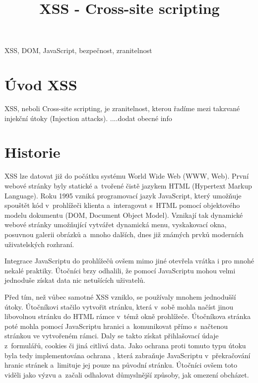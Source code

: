 \documentclass[conference]{IEEEtran}
\begin{document}
\title{XSS \-- Cross\--site scripting}

\author{
}
\maketitle

\begin{abstract}

\end{abstract}

\begin{IEEEkeywords}
XSS, DOM, JavaScript, bezpečnost, zranitelnost
\end{IEEEkeywords}

\section{Úvod XSS}
XSS, neboli Cross-site scripting, je zranitelnost, kterou řadíme mezi takzvané injekční útoky (Injection attacks). ....dodat obecné info

\section{Historie}
XSS lze datovat již do počátku systému World Wide Web (WWW, Web). První webové stránky byly statické a~tvořené čistě jazykem HTML (Hypertext Markup Language). Roku 1995 vzniká programovací jazyk JavaScript, který umožňuje spouštět kód v~prohlížeči klienta a~interagovat s~HTML pomocí objektového modelu dokumentu (DOM,  Document Object Model). Vznikají tak dynamické webové stránky umožňující vytvářet dynamická menu, vyskakovací okna, posuvnou galerii obrázků a~mnoho dalších, dnes již známých prvků moderních uživatelských rozhraní. 

Integrace JavaScriptu do prohlížečů ovšem mimo jiné otevřela vrátka i pro mnohé nekalé praktiky. Útočníci brzy odhalili, že pomocí JavaScriptu mohou velmi jednoduše získat data nic netušících uživatelů. 

Před tím, než vůbec samotné XSS vzniklo, se používaly mnohem jednodušší útoky. Útočníkovi stačilo vytvořit stránku, která v~sobě mohla načíst jinou libovolnou stránku do HTML rámce v~témž okně prohlížeče. Útočníkova stránka poté mohla pomocí JavaScriptu  hranici a~komunikovat přímo s~načtenou stránkou ve vytvořeném rámci. Daly se takto získat přihlašovací údaje z~formulářů, cookies či jiná citlivá data. Jako ochrana proti tomuto typu útoku byla tedy implementována ochrana , která zabraňuje JavaScriptu v~překračování hranic stránek a~limituje jej pouze na původní stránku. Útočníci ovšem toto viděli jako výzvu a~začali odhalovat důmyslnější způsoby, jak omezení obcházet.
\end{document}
